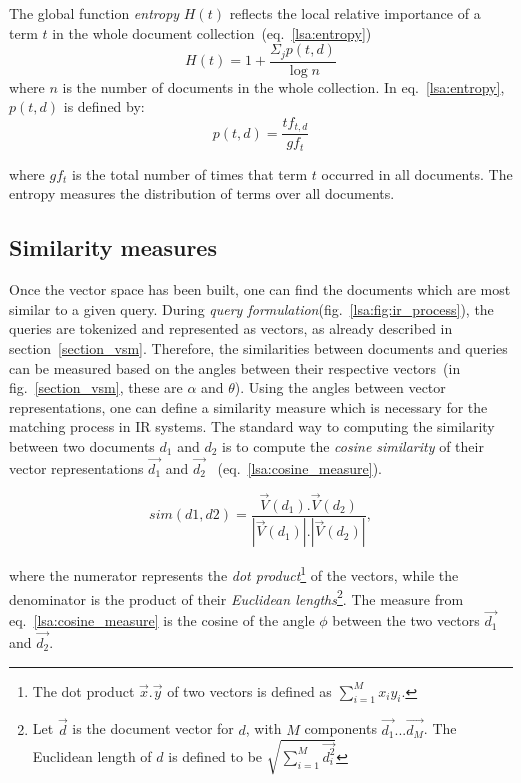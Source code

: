 The global function \textit{entropy} $H(t)$ reflects the local relative importance of a term $t$ in the whole document collection~(eq.~\ref{lsa:entropy}) \\

\begin{equation}
H(t) = 1+\frac{{\Sigma_{j}p(t,d)}}{\log n}
\label{lsa:entropy}
\end{equation}
where $n$ is the number of documents in the whole collection. In eq.~\ref{lsa:entropy}, $p(t,d)$ is defined by:
\begin{equation}
p(t,d) = \frac{tf_{t,d}}{gf_{t}}
\end{equation}

where $gf_{t}$ is the total number of times that term $t$ occurred in all documents. The entropy measures the distribution of terms over all documents. \\

\subsection{Similarity measures}
\label{lsa:similarity_measures}
Once the vector space has been built, one can find the documents which are most similar to a given query. During \textit{query formulation}(fig.~\ref{lsa:fig:ir_process}), the queries are tokenized and represented as vectors, as already described in section~\ref{section_vsm}. Therefore, the similarities between documents and queries can be measured based on the angles between their respective vectors~(in fig.~\ref{section_vsm}, these are $ \alpha $ and $ \theta $). Using the angles between vector representations, one can define a similarity measure which is necessary for the matching process in \gls{IR} systems. The standard way to computing the similarity between two documents $d_{1}$ and $d_{2}$ is to compute the \textit{cosine similarity} of their vector representations $\overrightarrow{d_1}$ and $\overrightarrow{d_2}$ ~(eq.~\ref{lsa:cosine_measure}).

%
%
\begin{equation}
\label{lsa:cosine_measure}
sim(d1,d2)=\frac{\overrightarrow{V}(d_1).\overrightarrow{V}(d_2)}{\left\vert \overrightarrow{V}(d_1) \right\vert.\left\vert \overrightarrow{V}(d_2)\right\vert},
\end{equation}

where the numerator represents the \textit{dot product}\footnote{The dot product $\overrightarrow{x}.\overrightarrow{y}$ of two vectors is defined as $\displaystyle\sum\limits_{i=1}^{M} x_{i}y_{i} $.} of the vectors, while the denominator is the product of their \textit{Euclidean lengths}\footnote{Let $\overrightarrow{d}$ is the document vector for $d$, with $M$ components $\overrightarrow{d_{1}}...\overrightarrow{d_{M}}$. The Euclidean length of $d$ is defined to be $ \sqrt{\sum\limits_{i=1}^{M} \overrightarrow{d_{i}^2}} $}. The measure from eq.~\ref{lsa:cosine_measure} is the cosine of the angle $ \phi $ between the two vectors $\overrightarrow{d_1}$ and $\overrightarrow{d_2}$. \\

